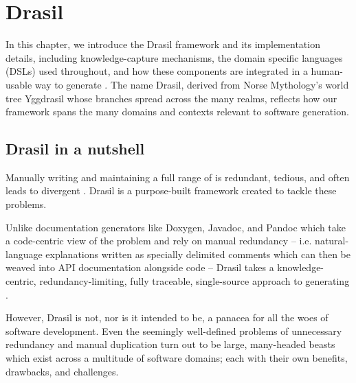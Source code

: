 \chapter{Drasil}
\label{c:drasil}
%

In this chapter, we introduce the Drasil framework and its implementation 
details, including knowledge-capture mechanisms, the domain specific 
languages (DSLs) used throughout, and how these components are integrated 
in a human-usable way to generate \sfs{}. The name Drasil, derived from Norse 
Mythology's world tree Yggdrasil whose branches spread across the 
many realms, reflects how our framework spans the many domains and contexts 
relevant to software generation.
      
\section{Drasil in a nutshell}

Manually writing and maintaining a full range of \sfs{} is redundant, tedious, 
and often leads to divergent \sfs{}. Drasil is a purpose-built framework 
created to tackle these problems.

Unlike documentation generators like Doxygen, Javadoc, and Pandoc
which take a code-centric view of the problem and rely on manual redundancy -- 
i.e. natural-language explanations written as specially delimited
comments which can then be weaved into API documentation alongside code -- 
Drasil takes a knowledge-centric, redundancy-limiting, fully traceable, 
single-source approach to generating \sfs{}.

However, Drasil is not, nor is it intended to be, a panacea for all the woes of 
software development. Even the seemingly well-defined problems of unnecessary 
redundancy and manual duplication turn out to be large, many-headed beasts 
which exist across a multitude of software domains; each with their own 
benefits, drawbacks, and challenges.

